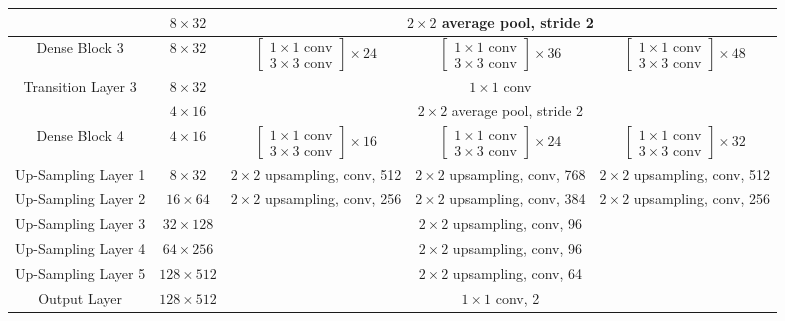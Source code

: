 \begin{table}[!ht]
\begin{tiny}
\begin{tabular}{c|c|c|c|c}
        \cline{2-5}
         & $8\times 32$ & \multicolumn{3}{c}{$2\times 2$ average pool, stride 2} \\
        \hline
        Dense Block 3 & $8\times 32$ & $\begin{bmatrix}1\times 1 \text{ conv} \\3\times 3 \text{ conv} \end{bmatrix}\times 24$ & $\begin{bmatrix}1\times 1 \text{ conv} \\3\times 3 \text{ conv} \end{bmatrix}\times 36$ & $\begin{bmatrix}1\times 1 \text{ conv} \\3\times 3 \text{ conv} \end{bmatrix}\times 48$ \\
        \hline
        \multirow{2}{*}{Transition Layer 3} & $8\times 32$ & \multicolumn{3}{c}{$1\times 1$ conv} \\
        \cline{2-5}
         & $4\times 16$ & \multicolumn{3}{c}{$2\times 2$ average pool, stride 2} \\
        \hline
        Dense Block 4 & $4\times 16$ & $\begin{bmatrix}1\times 1 \text{ conv} \\3\times 3 \text{ conv} \end{bmatrix}\times 16$ & $\begin{bmatrix}1\times 1 \text{ conv} \\3\times 3 \text{ conv} \end{bmatrix}\times 24$ & $\begin{bmatrix}1\times 1 \text{ conv} \\3\times 3 \text{ conv} \end{bmatrix}\times 32$ \\
        \hline
        Up-Sampling Layer 1 & $8\times 32$ & $2\times 2$ upsampling, conv, 512 & $2\times 2$ upsampling, conv, 768 & $2\times 2 $ upsampling, conv, 512 \\
        \hline
        Up-Sampling Layer 2 & $16\times 64$ & $2\times 2$ upsampling, conv, 256 & $2\times 2$ upsampling, conv, 384 & $2\times 2$ upsampling, conv, 256 \\
        \hline
        Up-Sampling Layer 3 & $32\times 128$ & \multicolumn{3}{c}{$2\times 2$ upsampling, conv, 96} \\
        \hline
        Up-Sampling Layer 4 & $64\times 256$ & \multicolumn{3}{c}{$2\times 2$ upsampling, conv, 96} \\
        \hline
        Up-Sampling Layer 5 & $128\times 512$ & \multicolumn{3}{c}{$2\times 2$ upsampling, conv, 64} \\
        \hline
        Output Layer & $128\times 512$ & \multicolumn{3}{c}{$1\times 1$ conv, 2} \\
        \bottomrule
    \end{tabular}
    \end{tiny}
    \label{tab:uate_denseunet_architecture}
\end{table}